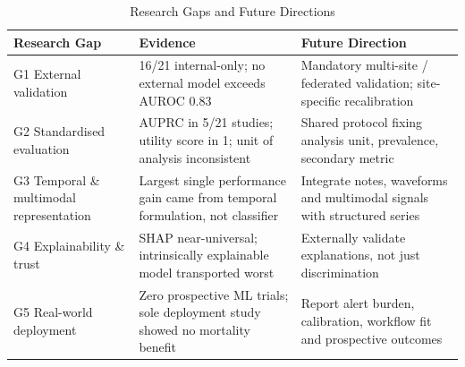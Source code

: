 \documentclass[conference]{IEEEtran}
\begin{document}
\begin{table}[t]
\caption{Research Gaps and Future Directions}
\label{tab:gaps}
\centering
\footnotesize
\begin{tabular}{@{}p{2.6cm}p{6.8cm}p{6.8cm}@{}}
\toprule
\textbf{Research Gap} & \textbf{Evidence} & \textbf{Future Direction} \\
\midrule
G1 External validation & 16/21 internal-only; no external model exceeds AUROC 0.83 & Mandatory multi-site / federated validation; site-specific recalibration \\
G2 Standardised evaluation & AUPRC in 5/21 studies; utility score in 1; unit of analysis inconsistent & Shared protocol fixing analysis unit, prevalence, secondary metric \\
G3 Temporal \& multimodal representation & Largest single performance gain came from temporal formulation, not classifier & Integrate notes, waveforms and multimodal signals with structured series \\
G4 Explainability \& trust & SHAP near-universal; intrinsically explainable model transported worst & Externally validate explanations, not just discrimination \\
G5 Real-world deployment & Zero prospective ML trials; sole deployment study showed no mortality benefit & Report alert burden, calibration, workflow fit and prospective outcomes \\
\bottomrule
\end{tabular}
\end{table}
\end{document}
